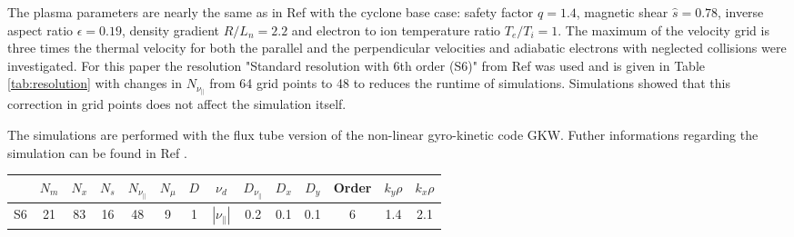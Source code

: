 \documentclass[aip, amsmath, amssymb, reprint, twocolumn]{revtex4-1}
\begin{document}
The plasma parameters are nearly the same as in Ref  with the cyclone base case: safety factor $q = 1.4$, magnetic shear $\hat{s} = 0.78$, inverse aspect ratio $\epsilon = 0.19$, density gradient $R/L_n = 2.2$ and electron to ion temperature ratio $T_e/T_i = 1$. The maximum of the velocity grid is three times the thermal velocity for both the parallel and the perpendicular velocities and adiabatic electrons with neglected collisions were investigated. For this paper the resolution "Standard resolution with 6th order (S6)" from Ref  was used and is given in Table \ref{tab:resolution} with changes in $N_{\nu_\parallel}$ from 64 grid points to 48 to reduces the runtime of simulations. Simulations showed that this correction in grid points does not affect the simulation itself.

The simulations are performed with the flux tube version of the non-linear gyro-kinetic code GKW.\cite{Peeters20092650}
Futher informations regarding the simulation can be found in Ref .

\begin{center}
	\captionsetup{type=table}
	\begin{ruledtabular}
		\begin{tabular}{l | ccccc | ccccc | c | cc}
			& $N_m$ & $N_x$ & $N_s$ & $N_{\nu_\parallel}$ & $N_\mu$ & $D$ & $\nu_d$           & $D_{\nu_\parallel}$ & $D_x$ & $D_y$ & Order & $k_y\rho$ & $k_x\rho$ \\
			\hline
			S6   & 21    & 83    & 16    & 48                  & 9       & 1   & $|\nu_\parallel|$ & 0.2                 & 0.1   & 0.1   & 6     & 1.4       & 2.1       \\
		\end{tabular}
	\end{ruledtabular}
	\label{tab:resolution}
\end{center}
\end{document}
